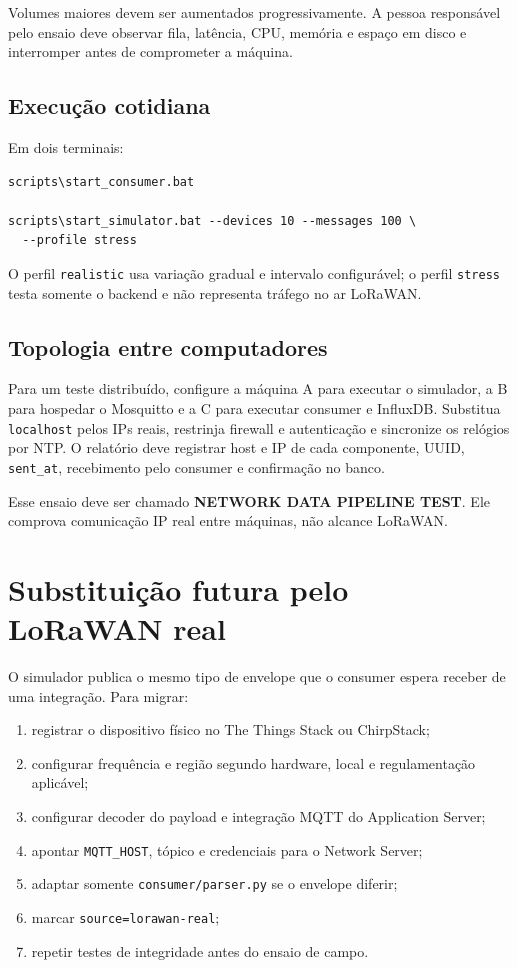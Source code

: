 \documentclass[12pt,a4paper]{article}
\newcommand{\code}[1]{\texttt{#1}}
\begin{document}
Volumes maiores devem ser aumentados progressivamente. A pessoa responsável pelo ensaio deve observar fila, latência, CPU, memória e espaço em disco e interromper antes de comprometer a máquina.

\subsection{Execução cotidiana}

Em dois terminais:

\begin{lstlisting}
scripts\start_consumer.bat

scripts\start_simulator.bat --devices 10 --messages 100 \
  --profile stress
\end{lstlisting}

O perfil \code{realistic} usa variação gradual e intervalo configurável; o perfil \code{stress} testa somente o backend e não representa tráfego no ar LoRaWAN.

\subsection{Topologia entre computadores}

Para um teste distribuído, configure a máquina A para executar o simulador, a B para hospedar o Mosquitto e a C para executar consumer e InfluxDB. Substitua \code{localhost} pelos IPs reais, restrinja firewall e autenticação e sincronize os relógios por NTP. O relatório deve registrar host e IP de cada componente, UUID, \code{sent\_at}, recebimento pelo consumer e confirmação no banco.

Esse ensaio deve ser chamado \textbf{NETWORK DATA PIPELINE TEST}. Ele comprova comunicação IP real entre máquinas, não alcance LoRaWAN.

\section{Substituição futura pelo LoRaWAN real}

O simulador publica o mesmo tipo de envelope que o consumer espera receber de uma integração. Para migrar:

\begin{enumerate}
  \item registrar o dispositivo físico no The Things Stack ou ChirpStack;
  \item configurar frequência e região segundo hardware, local e regulamentação aplicável;
  \item configurar decoder do payload e integração MQTT do Application Server;
  \item apontar \code{MQTT\_HOST}, tópico e credenciais para o Network Server;
  \item adaptar somente \code{consumer/parser.py} se o envelope diferir;
  \item marcar \code{source=lorawan-real};
  \item repetir testes de integridade antes do ensaio de campo.
\end{enumerate}
\end{document}
